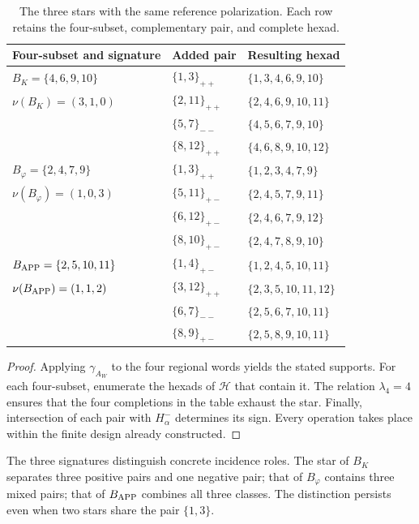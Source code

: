 \begin{table}[htbp]
\centering\small
\begin{tabular}{lll}
\toprule
Four-subset and signature & Added pair & Resulting hexad\\
\midrule
\(B_K=\{4,6,9,10\}\) & \(\{1,3\}_{++}\) & \(\{1,3,4,6,9,10\}\)\\
\(\nu(B_K)=(3,1,0)\) & \(\{2,11\}_{++}\) & \(\{2,4,6,9,10,11\}\)\\
 & \(\{5,7\}_{--}\) & \(\{4,5,6,7,9,10\}\)\\
 & \(\{8,12\}_{++}\) & \(\{4,6,8,9,10,12\}\)\\
\midrule
\(B_\varphi=\{2,4,7,9\}\) & \(\{1,3\}_{++}\) & \(\{1,2,3,4,7,9\}\)\\
\(\nu(B_\varphi)=(1,0,3)\) & \(\{5,11\}_{+-}\) & \(\{2,4,5,7,9,11\}\)\\
 & \(\{6,12\}_{+-}\) & \(\{2,4,6,7,9,12\}\)\\
 & \(\{8,10\}_{+-}\) & \(\{2,4,7,8,9,10\}\)\\
\midrule
\(B_{\rm APP}=\{2,5,10,11\}\) & \(\{1,4\}_{+-}\) & \(\{1,2,4,5,10,11\}\)\\
\(\nu(B_{\rm APP})=(1,1,2)\) & \(\{3,12\}_{++}\) & \(\{2,3,5,10,11,12\}\)\\
 & \(\{6,7\}_{--}\) & \(\{2,5,6,7,10,11\}\)\\
 & \(\{8,9\}_{+-}\) & \(\{2,5,8,9,10,11\}\)\\
\bottomrule
\end{tabular}
\caption{The three stars with the same reference polarization.
Each row retains the four-subset, complementary pair, and complete hexad.}
\label{star27:tabla-tres}
\end{table}

\begin{proof}
Applying \(\gamma_{A_W}\) to the four regional words yields
the stated supports. For each four-subset, enumerate the hexads
of \(\mathcal H\) that contain it. The relation \(\lambda_4=4\)
ensures that the four completions in the table exhaust the star.
Finally, intersection of each pair with \(H^-_\alpha\)
determines its sign. Every operation takes place within the
finite design already constructed.
\end{proof}

The three signatures distinguish concrete incidence roles.
The star of \(B_K\) separates three positive pairs and one
negative pair; that of \(B_\varphi\) contains three mixed pairs;
that of \(B_{\rm APP}\) combines all three classes. The
distinction persists even when two stars share the pair
\(\{1,3\}\).

